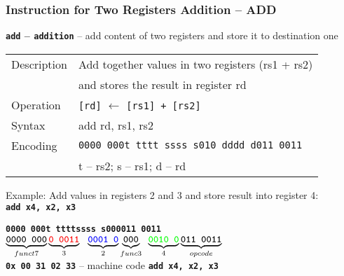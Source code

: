 \documentclass{beamer}
\begin{document}
\begin{frame}
\frametitle{Instruction for Two Registers Addition -- ADD}

\textbf{\texttt{add} -- \texttt{addition}} -- add content of two registers and store it to destination one

\bigskip

\begin{tabular}{|l|l|}\hline
Description & Add together values in two registers (rs1 + rs2) \\
            & and stores the result in register rd \\ \hline
Operation& \texttt{[rd]} $\leftarrow$ \texttt{[rs1] + [rs2]} \\ \hline
Syntax & add rd, rs1, rs2 \\ \hline
Encoding & \texttt{0000 000t tttt ssss s010 dddd d011 0011} \\
 & t -- rs2; s -- rs1; d -- rd \\ \hline
\end{tabular}

\bigskip

Example: Add values in registers 2 and 3 and store result into register 4:\\
\textbf{\texttt{add x4, x2, x3}}

\textbf{\texttt{0000 000\hspace{0.08cm}\color{red}t tttt}}\phantom{x}\hspace{0.13cm}\textbf{\texttt{\color{blue}ssss s}}\hspace{0.1cm}\textbf{\texttt{000\hspace{0.05cm}011 0011}}\\
$\underbrace{\textbf{\texttt{0000 000}}}_{funct7}
\underbrace{\textbf{\texttt{\color{red}0 0011}}}_{3}
\texttt{ }\underbrace{\textbf{\texttt{\color{blue}0001 0}}}_{2}
\underbrace{\textbf{\texttt{000}}}_{func3}\phantom{i}
\underbrace{\textbf{\texttt{\color{green}0010 0}}}_{4}
\underbrace{\textbf{\texttt{011 0011}}}_{opcode}$\\

\textbf{\texttt{0x 00 31 02 33}} -- machine code \textbf{\texttt{add x4, x2, x3}}


\end{frame}
\end{document}
